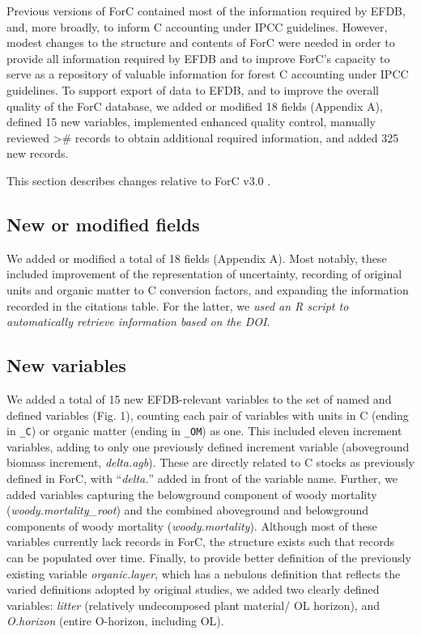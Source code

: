 \documentclass[, manuscript]{copernicus}
\begin{document}
Previous versions of ForC
\citep{anderson-teixeira_carbon_2016, anderson-teixeira_forc_2018, anderson-teixeira_carbon_2021}
contained most of the information required by EFDB, and, more broadly,
to inform C accounting under IPCC guidelines. However, modest changes to
the structure and contents of ForC were needed in order to provide all
information required by EFDB and to improve ForC's capacity to serve as
a repository of valuable information for forest C accounting under IPCC
guidelines. To support export of data to EFDB, and to improve the
overall quality of the ForC database, we added or modified 18 fields
(Appendix A), defined 15 new variables, implemented enhanced quality
control, manually reviewed \textgreater\# records to obtain additional
required information, and added 325 new records.

This section describes changes relative to ForC v3.0
\citep{anderson-teixeira_carbon_2021}.

\subsection{New or modified fields}

We added or modified a total of 18 fields (Appendix A). Most notably,
these included improvement of the representation of uncertainty,
recording of original units and organic matter to C conversion factors,
and expanding the information recorded in the citations table. For the
latter, we \emph{used an R script to automatically retrieve information
based on the DOI}.

\subsection{New variables}

We added a total of 15 new EFDB-relevant variables to the set of named
and defined variables (Fig. 1), counting each pair of variables with
units in C (ending in \texttt{\_C}) or organic matter (ending in
\texttt{\_OM}) as one. This included eleven increment variables, adding
to only one previously defined increment variable (aboveground biomass
increment, \emph{delta.agb}). These are directly related to C stocks as
previously defined in ForC, with ``\emph{delta.}'' added in front of the
variable name. Further, we added variables capturing the belowground
component of woody mortality (\emph{woody.mortality\_root}) and the
combined aboveground and belowground components of woody mortality
(\emph{woody.mortality}). Although most of these variables currently
lack records in ForC, the structure exists such that records can be
populated over time. Finally, to provide better definition of the
previously existing variable \emph{organic.layer}, which has a nebulous
definition that reflects the varied definitions adopted by original
studies, we added two clearly defined variables: \emph{litter}
(relatively undecomposed plant material/ OL horizon), and
\emph{O.horizon} (entire O-horizon, including OL).
\end{document}
